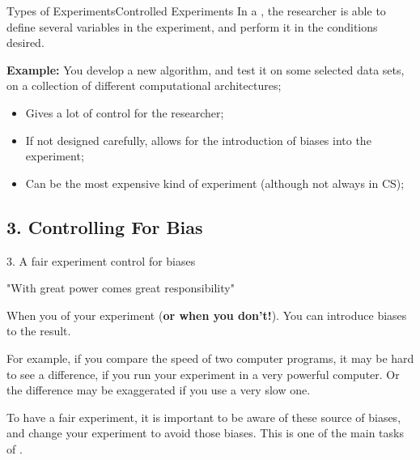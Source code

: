 \begin{frame}{Types of Experiments}{Controlled Experiments}
  In a , the researcher is able to define several variables in the experiment, and perform it in the conditions desired.\bigskip

  {\bf Example:} You develop a new algorithm, and test it on some selected data sets, on a collection of different computational architectures;\bigskip

  \begin{itemize}
    \item Gives a lot of control for the researcher;
    \item If not designed carefully, allows for the introduction of biases into the experiment;
    \item Can be the most expensive kind of experiment (although not always in CS);
  \end{itemize}
\end{frame}


\subsection{3. Controlling For Bias}

\begin{frame}{3. A fair experiment control for biases}
  \begin{block}{}
    \hfill "With great power comes great responsibility"
  \end{block}\bigskip

  When you  of your experiment ({\bf or when you don't!}). You can introduce biases to the result.\bigskip

  For example, if you compare the speed of two computer programs, it may be hard to see a difference, if you run your experiment in a very powerful computer. Or the difference may be exaggerated if you use a very slow one.\bigskip

  To have a fair experiment, it is important to be aware of these source of biases, and change your experiment to avoid those biases. This is one of the main tasks of .
\end{frame}

